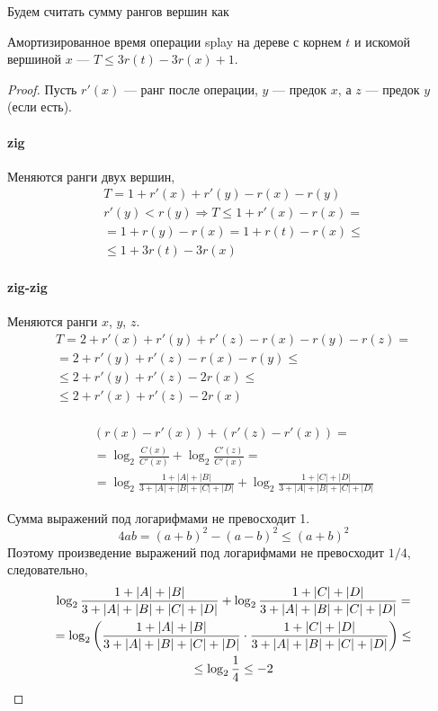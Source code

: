 Будем считать сумму рангов вершин как

\begin{theorem}
    Амортизированное время операции splay
    на дереве с корнем $t$ и искомой вершиной $x$
    --- $T \le 3r(t) - 3r(x) + 1$.
\end{theorem}
\begin{proof}
    Пусть $r'(x)$ --- ранг после операции,
    $y$ --- предок $x$, а $z$ --- предок $y$ (если есть).

    \paragraph{zig}
    Меняются ранги двух вершин,
    \begin{gather*}
        T = 1 + r'(x) + r'(y) - r(x) - r(y) \\
        r'(y) < r(y) \Rightarrow T \le 1 + r'(x) - r(x) = \\
        = 1 + r(y) - r(x) = 1 + r(t) - r(x) \le \\
        \le 1 + 3 r(t) - 3 r(x)
    \end{gather*}

    \paragraph{zig-zig}
    Меняются ранги $x$, $y$, $z$.
    \begin{gather*}
        T = 2 + r'(x) + r'(y) + r'(z) - r(x) - r(y) - r(z) = \\
        = 2 + r'(y) + r'(z) - r(x) - r(y) \le \\
        \le 2 + r'(y) + r'(z) - 2 r(x) \le \\
        \le 2 + r'(x) + r'(z) - 2 r(x) \\
    \end{gather*}

    \begin{gather*}
        (r(x) - r'(x)) + (r'(z) - r'(x)) = \\
        = \log_2 \frac{C(x)}{C'(x)} + \log_2 \frac{C'(z)}{C'(x)} = \\
        = \log_2 \frac{1 + |A| + |B|}{3 + |A| + |B| + |C| + |D|}
        + \log_2 \frac{1 + |C| + |D|}{3 + |A| + |B| + |C| + |D|}
    \end{gather*}

    Сумма выражений под логарифмами не превосходит 1.
    \[
        4ab = (a + b)^2 - (a - b)^2 \le (a + b)^2
    \]
    Поэтому произведение выражений под логарифмами
    не превосходит $1/4$, следовательно,
    \begin{gather*}
        \log_2 \frac{1 + |A| + |B|}{3 + |A| + |B| + |C| + |D|}
        + \log_2 \frac{1 + |C| + |D|}{3 + |A| + |B| + |C| + |D|} = \\
        = \log_2 \left( 
            \frac{1 + |A| + |B|}{3 + |A| + |B| + |C| + |D|} \cdot
            \frac{1 + |C| + |D|}{3 + |A| + |B| + |C| + |D|} \right) \le \\
        \le \log_2 \frac{1}{4} \le -2 \\
    \end{gather*}


\end{proof}
